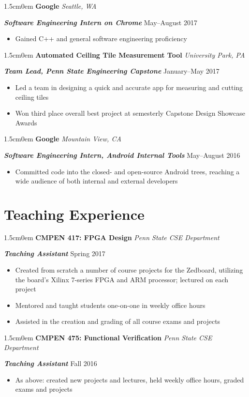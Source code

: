 \documentclass[letterpaper]{article}
\newcommand{\primaryindent}{1.5cm} %
\newenvironment{indented}{\begin{adjustwidth}{\primaryindent}{0em}}{\end{adjustwidth}}
\newenvironment{resumelist}{\begin{itemize}[topsep=0pt,noitemsep,itemindent=-15pt,leftmargin=30pt]}{\end{itemize}}
\newcommand{\generalentry}[5]{
	\begin{indented}
		\Large \textsf{\textbf{#1}} \hfill	%
			\hfill\normalsize\textit{#2} \par  			%
		\noindent \large \textsf{\textbf{\textit{#3}}} 	%
			\hfill \normalsize #4\par 					%
		\normalsize \normalfont #5 \par					%
		\normalsize \normalfont
	\end{indented}
	}
\begin{document}
\generalentry{Google}{Seattle, WA}{Software Engineering Intern on Chrome}{May--August 2017}{
	\begin{resumelist}
		\item Gained C++ and general software engineering proficiency
	\end{resumelist}
}
\vspace{3mm}
\generalentry{Automated Ceiling Tile Measurement Tool}{University Park, PA}{Team Lead, Penn State Engineering Capstone}{January--May 2017}{
	\begin{resumelist}
		\item Led a team in designing a quick and accurate app for measuring and cutting ceiling tiles
		\item Won third place overall best project at semesterly Capstone Design Showcase Awards 
	\end{resumelist}
}

\vspace{3mm}


\generalentry{Google}{Mountain View, CA}{Software Engineering Intern, Android Internal Tools}{May--August 2016}{
	\begin{resumelist}
		\item Committed code into the closed- and open-source Android trees, reaching a wide audience of both internal and external developers
	\end{resumelist}
}

\section*{Teaching Experience}

\generalentry{CMPEN 417: FPGA Design}{Penn State CSE Department}{Teaching Assistant}{Spring 2017}{
	\begin{resumelist}
		\item Created from scratch a number of course projects for the Zedboard, utilizing the board's Xilinx 7-series FPGA and ARM processor; lectured on each project
		\item Mentored and taught students one-on-one in weekly office hours
		\item Assisted in the creation and grading of all course exams and projects
	\end{resumelist}
}

\vspace{3mm}

\generalentry{CMPEN 475: Functional Verification}{Penn State CSE Department}{Teaching Assistant}{Fall 2016}{
	\begin{resumelist}
		\item As above: created new projects and lectures, held weekly office hours, graded exams and projects
	\end{resumelist}
}
\end{document}
